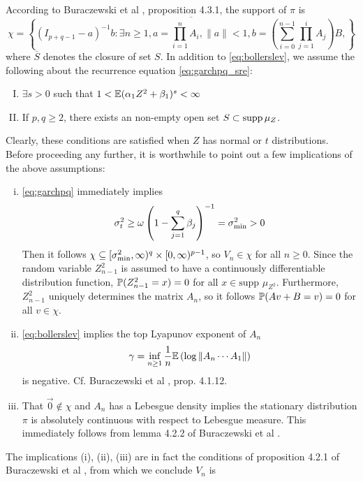 \documentclass[aoas,preprint]{imsart}
\numberwithin{equation}{section}
\theoremstyle{plain}
\begin{document}
According to Buraczewski et al 
\cite{buraczewski:damek:mikosch:2016}, proposition 4.3.1, the support
of $\pi$ is
\[
\chi = \overline{
  \left\{
  (I_{p+q-1} - a)^{-1} b:
  \exists n \geq 1,
  a = \prod_{i=1}^n A_i,
  \|a\| < 1,
  b = \left(\sum_{i=0}^{n-1} \prod_{j=1}^i A_{j}\right) B,
  \right\}
}
\]
where $\overline S$ denotes the closure of set $S$.
In addition to \eqref{eq:bollerslev}, we assume the following about
the recurrence equation \eqref{eq:garchpq_sre}:
\begin{enumerate}[(I)]
\item $\exists s > 0$ such that
  $1 < \E (\alpha_1 Z^2 + \beta_1)^s < \infty$
\item If $p, q \geq 2$, there exists an non-empty open set
  $S \subset \supp \mu_Z$.
\end{enumerate}
Clearly, these conditions are satisfied when $Z$ has normal or $t$
distributions.
Before proceeding any further, it is worthwhile to point out a few
implications of the above assumptions:
\begin{enumerate}[(i)]
\item \eqref{eq:garchpq} immediately implies
  \[
  \sigma_t^2 \geq \omega \left(
    1 - \sum_{j=1}^q \beta_j
  \right)^{-1} = \sigma_{\m}^2 > 0
  \]
  Then it follows
  $\chi \subseteq [\sigma_{\m}^2, \infty)^q \times [0, \infty)^{p-1}$, so
  $V_n \in \chi$ for all $n \geq 0$. Since the random variable
  $Z_{n-1}^2$ is assumed to have a continuously differentiable
  distribution function,
  $\P(Z_{n-1}^2 = x) = 0$ for all $x \in \text{supp } \mu_{Z^2}$.
  Furthermore, $Z_{n-1}^2$ uniquely determines the matrix $A_n$,
  so it follows $\P(A v + B = v) = 0$ for all $v \in \chi$.

\item \eqref{eq:bollerslev} implies the top Lyapunov exponent of $A_n$
  \[
  \gamma = \inf_{n \geq 1} {1 \over n} \E \left(\log \| A_n \cdots A_1 \| \right)
  \]
  is negative. Cf. Buraczewski et al
  \cite{buraczewski:damek:mikosch:2016}, prop. 4.1.12.

\item That $\vec 0 \notin \chi$ and $A_n$ has a Lebesgue density implies
  the stationary distribution $\pi$ is absolutely continuous with
  respect to Lebesgue measure. This immediately follows from lemma
  4.2.2 of Buraczewski et al \cite{buraczewski:damek:mikosch:2016}.
\end{enumerate}
The implications (i), (ii), (iii) are in fact the conditions of
proposition 4.2.1 of Buraczewski et al
\cite{buraczewski:damek:mikosch:2016}, from which we conclude $V_n$ is
\end{document}

